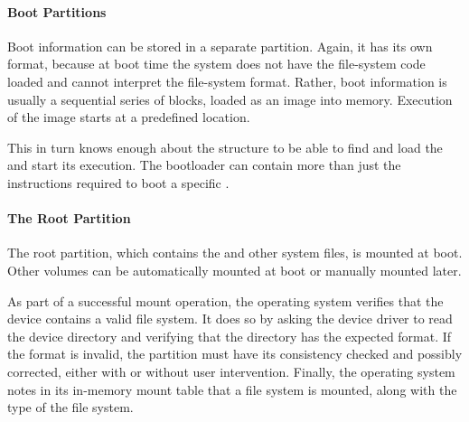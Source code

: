 \paragraph{Boot Partitions}\label{par:Boot_Partitions}
Boot information can be stored in a separate partition.
Again, it has its own format, because at boot time the system does not have the file-system code loaded and cannot interpret the file-system format.
Rather, boot information is usually a sequential series of blocks, loaded as an image into memory.
Execution of the image starts at a predefined location.

This  in turn knows enough about the  structure to be able to find and load the  and start its execution.
The bootloader can contain more than just the instructions required to boot a specific .

\paragraph{The Root Partition}\label{par:Root_Partition}
The root partition, which contains the   and other system files, is mounted at boot.
Other volumes can be automatically mounted at boot or manually mounted later.

As part of a successful mount operation, the operating system verifies that the device contains a valid file system.
It does so by asking the device driver to read the device directory and verifying that the directory has the expected format.
If the format is invalid, the partition must have its consistency checked and possibly corrected, either with or without user intervention.
Finally, the operating system notes in its in-memory mount table that a file system is mounted, along with the type of the file system.


